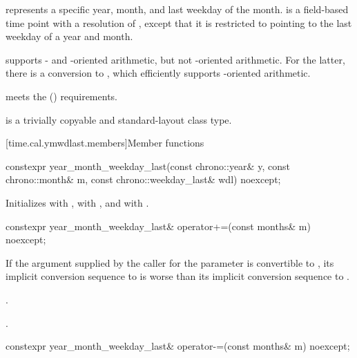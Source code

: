 \pnum
{} represents a specific year, month,
and last weekday of the month.
 is a field-based time point with a resolution of ,
except that it is restricted to pointing to the last weekday of a year and month.
\begin{note}
 supports - and -oriented arithmetic,
but not -oriented arithmetic.
For the latter, there is a conversion to ,
which efficiently supports -oriented arithmetic.
\end{note}
 meets the  () requirements.

\pnum
{} is a trivially copyable and standard-layout class type.

[time.cal.ymwdlast.members]{Member functions}

%
\begin{itemdecl}
constexpr year_month_weekday_last(const chrono::year& y, const chrono::month& m,
                                  const chrono::weekday_last& wdl) noexcept;
\end{itemdecl}

\begin{itemdescr}
\pnum
\effects
Initializes  with ,  with , and  with .
\end{itemdescr}

%
\begin{itemdecl}
constexpr year_month_weekday_last& operator+=(const months& m) noexcept;
\end{itemdecl}

\begin{itemdescr}
\pnum
\constraints
If the argument supplied by the caller for the  parameter
is convertible to ,
its implicit conversion sequence to 
is worse than its implicit conversion sequence to
.

\pnum
\effects
{}.

\pnum
\returns
{}.
\end{itemdescr}

%
\begin{itemdecl}
constexpr year_month_weekday_last& operator-=(const months& m) noexcept;
\end{itemdecl}

